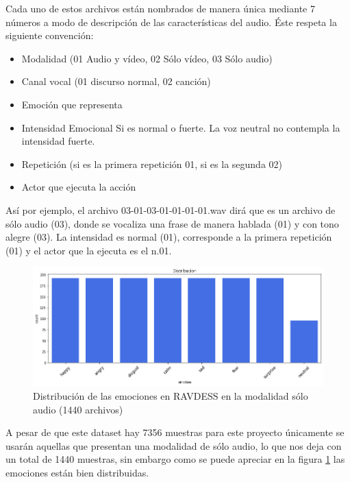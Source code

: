 \documentclass[11pt,a4paper,spanish]{book}
\begin{document}
	Cada uno de estos archivos están nombrados de manera única mediante 7 números a modo de descripción de las características del audio. Éste respeta la siguiente convención:
	\begin{itemize}
		\item Modalidad (01 Audio y vídeo, 02 Sólo vídeo, 03 Sólo audio)
		\item Canal vocal (01 discurso normal, 02 canción)
		\item Emoción que representa
		\item Intensidad Emocional Si es normal o fuerte. La voz neutral no contempla la intensidad fuerte.
		\item Repetición (si es la primera repetición 01, si es la segunda 02)
		\item Actor que ejecuta la acción
	\end{itemize}

	Así por ejemplo, el archivo 03-01-03-01-01-01-01.wav dirá que es un archivo de sólo audio (03), donde se vocaliza una frase de manera hablada (01) y con tono alegre (03). La intensidad es normal (01), corresponde a la primera repetición (01) y el actor que la ejecuta es el n.01.
	
	\begin{figure}[H]
		\centering
		\includegraphics[scale=0.25]{ravdess_distribucion.png} 
		\caption{Distribución de las emociones en RAVDESS en la modalidad sólo audio (1440 archivos)}
		\label{fig:emociones_ravdess}
	\end{figure}
	
	A pesar de que este dataset hay 7356 muestras para este proyecto únicamente se usarán aquellas que presentan una modalidad de sólo audio, lo que nos deja con un total de 1440 muestras, sin embargo como se puede apreciar en la figura \ref{fig:emociones_ravdess} las emociones están bien distribuidas.
	
\end{document}

